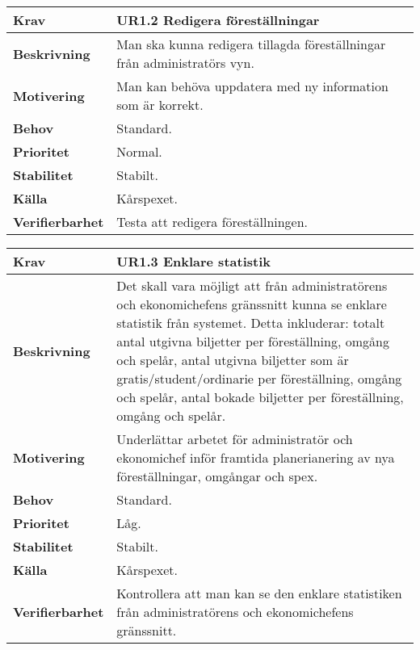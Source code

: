 \documentclass[a4paper, twoside, 11pt, titlepage]{article}
\begin{document}
		\begin{tabular} { p{2.6cm} p{12.5cm} }
			\hline
			\sffamily\textbf{Krav} & \sffamily\textbf{UR1.2 Redigera föreställningar  } \\
			\hline
			\sffamily\textbf{Beskrivning} & Man ska kunna redigera tillagda föreställningar från administratörs vyn.  \\
			\hline
			\sffamily\textbf{Motivering} & Man kan behöva uppdatera med ny information som är korrekt.  \\
			\hline
			\sffamily\textbf{Behov} & Standard.  \\
			\hline
			\sffamily\textbf{Prioritet} & Normal.  \\
			\hline
			\sffamily\textbf{Stabilitet} & Stabilt.  \\
			\hline
			\sffamily\textbf{Källa} & Kårspexet.  \\
			\hline
			\sffamily\textbf{Verifierbarhet} & Testa att redigera föreställningen.  \\
			\hline
		\end{tabular}
		\vspace{6mm}

		\begin{tabular} { p{2.6cm} p{12.5cm} }
			\hline
			\sffamily\textbf{Krav} & \sffamily\textbf{UR1.3 Enklare statistik  } \\
			\hline
			\sffamily\textbf{Beskrivning} & Det skall vara möjligt att från administratörens och ekonomichefens gränssnitt kunna se enklare statistik från systemet. Detta inkluderar: totalt antal utgivna biljetter per föreställning, omgång och spelår, antal utgivna biljetter som är gratis/student/ordinarie per föreställning, omgång och spelår, antal bokade biljetter per föreställning, omgång och spelår.  \\
			\hline
			\sffamily\textbf{Motivering} & Underlättar arbetet för administratör och ekonomichef inför framtida planerianering av nya föreställningar, omgångar och spex.  \\
			\hline
			\sffamily\textbf{Behov} & Standard.  \\
			\hline
			\sffamily\textbf{Prioritet} & Låg.  \\
			\hline
			\sffamily\textbf{Stabilitet} & Stabilt.  \\
			\hline
			\sffamily\textbf{Källa} & Kårspexet.  \\
			\hline
			\sffamily\textbf{Verifierbarhet} & Kontrollera att man kan se den enklare statistiken från administratörens och ekonomichefens gränssnitt.  \\
			\hline
		\end{tabular}
		\vspace{6mm}
\end{document}
